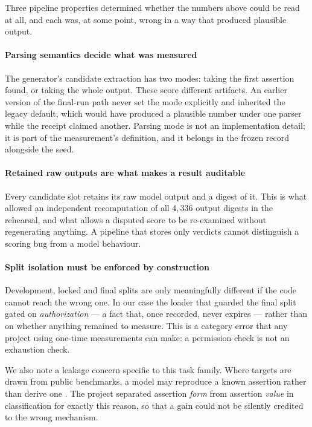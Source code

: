 \documentclass[10pt,conference]{IEEEtran}
\begin{document}
Three pipeline properties determined whether the numbers above could be read at
all, and each was, at some point, wrong in a way that produced plausible output.

\paragraph{Parsing semantics decide what was measured}
The generator's candidate extraction has two modes: taking the first assertion
found, or taking the whole output. These score different artifacts. An earlier
version of the final-run path never set the mode explicitly and inherited the
legacy default, which would have produced a plausible number under one parser
while the receipt claimed another. Parsing mode is not an implementation
detail; it is part of the measurement's definition, and it belongs in the
frozen record alongside the seed.

\paragraph{Retained raw outputs are what makes a result auditable}
Every candidate slot retains its raw model output and a digest of it. This is
what allowed an independent recomputation of all $4{,}336$ output digests in the
rehearsal, and what allows a disputed score to be re-examined without
regenerating anything. A pipeline that stores only verdicts cannot distinguish a
scoring bug from a model behaviour.

\paragraph{Split isolation must be enforced by construction}
Development, locked and final splits are only meaningfully different if the code
cannot reach the wrong one. In our case the loader that guarded the final split
gated on \emph{authorization} --- a fact that, once recorded, never expires ---
rather than on whether anything remained to measure. This is a category error
that any project using one-time measurements can make: a permission check is
not an exhaustion check.

We also note a leakage concern specific to this task family. Where targets are
drawn from public benchmarks, a model may reproduce a known assertion rather
than derive one \cite{yang2023rephrased,kapoor2023leakage}. The project
separated assertion \emph{form} from assertion \emph{value} in classification
for exactly this reason, so that a gain could not be silently credited to the
wrong mechanism.
\end{document}
